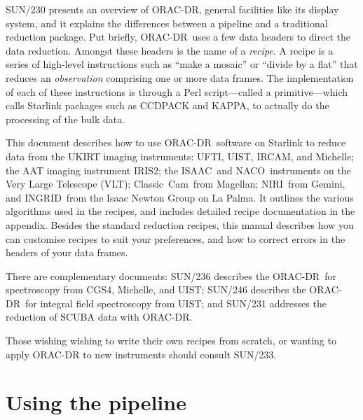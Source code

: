 \documentclass[twoside,11pt]{article}
\newcommand{\htmladdnormallink}[2]{#1}
\newcommand{\xref}[3]{#1}
\newcommand{\xlabel}[1]{}
\renewcommand{\_}{\texttt{\symbol{95}}}
\newcommand{\CCDPACK}{{\footnotesize CCDPACK}}
\newcommand{\KAPPA}{{\footnotesize KAPPA}}
\newcommand{\ORACDR}{{\footnotesize ORAC-DR}}
\newcommand{\VLT}{\htmladdnormallink{VLT}{http://www.eso.org/instruments/}}
\newcommand{\ClassicCam}{\htmladdnormallink{Classic~Cam}{http://www.ociw.edu/lco/magellan/instruments/Classic_Cam/}}
\newcommand{\INGRID}{\htmladdnormallink{INGRID}{http://www.ing.iac.es/Astronomy/instruments/ingrid/}}
\newcommand{\IRCAM}{\htmladdnormallink{IRCAM}{http://www.jach.hawaii.edu/JACpublic/UKIRT/instruments/ircam/ircam3.html}}
\newcommand{\IRIS}{\htmladdnormallink{IRIS2}{http://www.aao.gov.au/iris2/}}
\newcommand{\ISAAC}{\htmladdnormallink{ISAAC}{http://www.eso.org/instruments/isaac/}}
\newcommand{\Michelle}{\htmladdnormallink{Michelle}{http://www.jach.hawaii.edu/JACpublic/UKIRT/instruments/michelle/michelle.html}}
\newcommand{\NACO}{\htmladdnormallink{NACO}{http://www.eso.org/instruments/naco/}}
\newcommand{\NIRI}{\htmladdnormallink{NIRI}{http://www.gemini.edu/sciops/instruments/niri/}}
\newcommand{\UIST}{\htmladdnormallink{UIST}{http://www.jach.hawaii.edu/JACpublic/UKIRT/instruments/uist/uist.html}}
\newcommand{\UFTI}{\htmladdnormallink{UFTI}{http://www.jach.hawaii.edu/JACpublic/UKIRT/instruments/ufti/ufti.html}}
\begin{document}
\xref{SUN/230}{sun230}{} presents an overview of \ORACDR,
general facilities like its display system, and it explains the
differences between a pipeline and a traditional reduction package.
Put briefly, \ORACDR\ uses a few data headers to direct the data
reduction.  Amongst these headers is the name of a {\em recipe}.  A
recipe is a series of high-level instructions such as ``make a
mosaic'' or ``divide by a flat'' that reduces an {\em observation\/}
comprising one or more data frames.  The implementation of each of
these instructions is through a Perl script---called a
primitive---which calls Starlink packages such as
\xref{\CCDPACK}{sun139}{} and \xref{\KAPPA}{sun95}{},
to actually do the processing of the bulk data.

This document describes how to use \ORACDR\ software on Starlink to
reduce data from the UKIRT imaging instruments: \UFTI, \UIST, \IRCAM, and
\Michelle; the AAT imaging instrument \IRIS; the \ISAAC\ and \NACO\
instruments on the Very Large Telescope (\VLT); \ClassicCam\ from
Magellan; \NIRI\ from Gemini, and \INGRID\ from the Isaac Newton
Group on La Palma.  It outlines the various algorithms used in the
recipes, and includes detailed recipe documentation in the appendix.
Besides the standard reduction recipes, this manual describes how you
can customise recipes to suit your preferences, and how to correct
errors in the headers of your data frames.

There are complementary documents: \xref{SUN/236}{sun236}{} describes the
\ORACDR\ for spectroscopy from CGS4, Michelle, and UIST; \xref{SUN/246}{sun246}{}
describes the \ORACDR\ for integral field spectroscopy from UIST;
and \xref{SUN/231}{sun231}{} addresses the reduction of SCUBA data with \ORACDR.



Those wishing wishing to write their own recipes from scratch, or wanting
to apply ORAC-DR to new instruments should consult \xref{SUN/233}{sun233}{}.

\section{\xlabel{using_the_pipeline}Using the pipeline\label{using_the_pipeline}}
\end{document}
